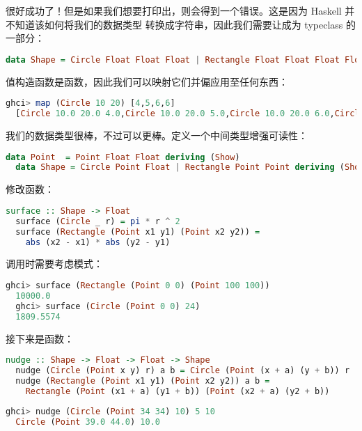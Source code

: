 \documentclass[./main.tex]{subfiles}
\begin{document}
很好成功了！但是如果我们想要打印出，则会得到一个错误。这是因为 Haskell 并不知道该如何将我们的数据类型
转换成字符串，因此我们需要让成为 typeclass 的一部分：

\begin{lstlisting}[language=Haskell]
  data Shape = Circle Float Float Float | Rectangle Float Float Float Float deriving (Show)
\end{lstlisting}

值构造函数是函数，因此我们可以映射它们并偏应用至任何东西：

\begin{lstlisting}[language=Haskell]
  ghci> map (Circle 10 20) [4,5,6,6]
  [Circle 10.0 20.0 4.0,Circle 10.0 20.0 5.0,Circle 10.0 20.0 6.0,Circle 10.0 20.0 6.0]
\end{lstlisting}

我们的数据类型很棒，不过可以更棒。定义一个中间类型增强可读性：

\begin{lstlisting}[language=Haskell]
  data Point  = Point Float Float deriving (Show)
  data Shape = Circle Point Float | Rectangle Point Point deriving (Show)
\end{lstlisting}

修改函数：

\begin{lstlisting}[language=Haskell]
  surface :: Shape -> Float
  surface (Circle _ r) = pi * r ^ 2
  surface (Rectangle (Point x1 y1) (Point x2 y2)) =
    abs (x2 - x1) * abs (y2 - y1)
\end{lstlisting}

调用时需要考虑模式：

\begin{lstlisting}[language=Haskell]
  ghci> surface (Rectangle (Point 0 0) (Point 100 100))
  10000.0
  ghci> surface (Circle (Point 0 0) 24)
  1809.5574
\end{lstlisting}

接下来是函数：

\begin{lstlisting}[language=Haskell]
  nudge :: Shape -> Float -> Float -> Shape
  nudge (Circle (Point x y) r) a b = Circle (Point (x + a) (y + b)) r
  nudge (Rectangle (Point x1 y1) (Point x2 y2)) a b =
    Rectangle (Point (x1 + a) (y1 + b)) (Point (x2 + a) (y2 + b))
\end{lstlisting}

\begin{lstlisting}[language=Haskell]
  ghci> nudge (Circle (Point 34 34) 10) 5 10
  Circle (Point 39.0 44.0) 10.0
\end{lstlisting}
\end{document}
